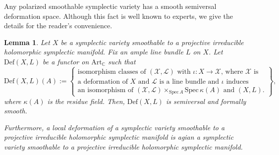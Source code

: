 \documentclass[12pt,twoside]{amsart}
\newtheorem{lem}[thm]{Lemma}
\theoremstyle{definition}
\begin{document}
Any polarized smoothable symplectic variety has a smooth semiversal deformation space. 
Although this fact is well known to experts, we give the details for the reader's convenience. 
 
 
\begin{lem}\label{lem--smoothness--hk--moduli}
    Let $X$ be a symplectic variety smoothable to a projective irreducible holomorphic symplectic manifold. Fix an ample line bundle $L$ on $X$.
    Let $\mathrm{Def}(X,L)$ be a functor on $\mathrm{Art}_{\mathbb{C}}$ such that 
    \[
    \mathrm{Def}(X,L)(A):=
    \left\{
\begin{array}{l}
\!\!\text{isomorphism classes of $(\mathcal{X},\mathcal{L})$ with $\iota\colon X\to \mathcal{X}$, where $\mathcal{X}$ is}\\
\!\!\text{a deformation of $X$ and $\mathcal{L}$ is a line bundle and $\iota$ induces}\\
\!\!\text{an isomorphism of $(\mathcal{X},\mathcal{L})\times_{\mathrm{Spec}\,A}\mathrm{Spec}\,\kappa(A)$ and $(X,L)$.}
\end{array}\right\},
    \]
    where $\kappa(A)$ is the residue field.
 Then, $ \mathrm{Def}(X,L)$ is semiversal and formally smooth.

    Furthermore, a local deformation of a symplectic variety smoothable to a projective irreducible holomorphic symplectic manifold is agian a symplectic variety smoothable to a projective irreducible holomorphic symplectic manifold.
\end{lem}
\end{document}
